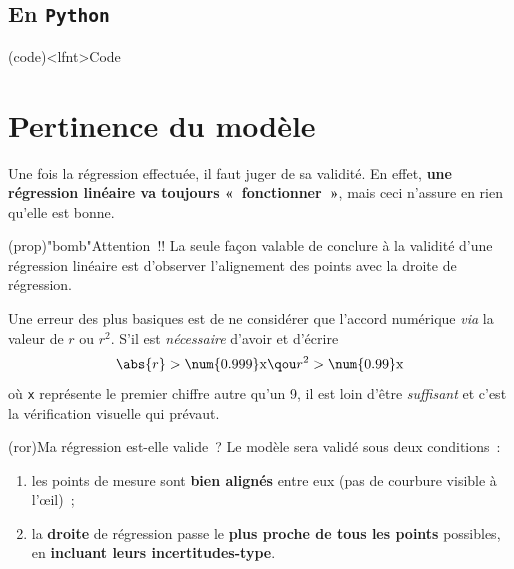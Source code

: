 \documentclass[a4paper, 12pt, garamond]{book}
\begin{document}
\subsection{En \texttt{Python}}
\begin{tcb}[breakable](code)<lfnt>{Code}
	\vspace{-10pt}
	\vspace{-15pt}
\end{tcb}

\section{Pertinence du modèle}
Une fois la régression effectuée, il faut juger de sa validité. En effet,
\textbf{une régression linéaire va toujours «~fonctionner~»}, mais ceci n'assure
en rien qu'elle est bonne.

\begin{tcn}(prop)"bomb"{Attention~!!}
	La seule façon valable de conclure à la validité d'une régression linéaire est
	d'observer l'alignement des points avec la droite de régression.
\end{tcn}

Une erreur des plus basiques est de ne considérer que l'accord numérique
\textit{via} la valeur de $r$ ou $r^{2}$. S'il est \textit{nécessaire} d'avoir
et d'écrire
\[
	\abs{r} > \num{0.999}\mathrm{x}
	\qou
	r^{2} > \num{0.99}\mathrm{x}
\]
où \texttt{x} représente le premier chiffre autre qu'un 9, il est loin d'être
\textit{suffisant} et c'est la vérification visuelle qui prévaut.

\begin{tcn}(ror){Ma régression est-elle valide~?}
	Le modèle sera validé sous deux conditions~:
	\begin{enumerate}
		\item les points de mesure sont \textbf{bien alignés} entre eux (pas de
		      courbure visible à l'œil)~;
		\item la \textbf{droite} de régression passe le \textbf{plus proche de tous
			      les points} possibles, en \textbf{incluant leurs incertitudes-type}.
	\end{enumerate}
\end{tcn}
\end{document}
